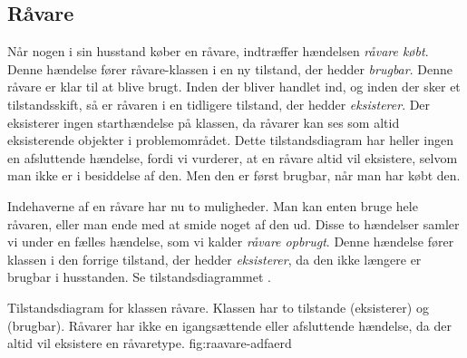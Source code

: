 \subsection{Råvare}
Når nogen i sin husstand køber en råvare, indtræffer hændelsen \textit{råvare købt}. Denne hændelse fører råvare-klassen i en ny tilstand, der hedder \textit{brugbar}. Denne råvare er klar til at blive brugt. Inden der bliver handlet ind, og inden der sker et tilstandsskift, så er råvaren i en tidligere tilstand, der hedder \textit{eksisterer}. Der eksisterer ingen starthændelse på klassen, da råvarer kan ses som altid eksisterende objekter i problemområdet. Dette tilstandsdiagram har heller ingen en afsluttende hændelse, fordi vi vurderer, at en råvare altid vil eksistere, selvom man ikke er i besiddelse af den. Men den er først brugbar, når man har købt den. 

Indehaverne af en råvare har nu to muligheder. Man kan enten bruge hele råvaren, eller man ende med at smide noget af den ud. Disse to hændelser samler vi  under en fælles hændelse, som vi kalder \textit{råvare opbrugt}. Denne hændelse fører klassen i den forrige tilstand, der hedder \textit{eksisterer}, da den ikke længere er brugbar i husstanden. Se tilstandsdiagrammet .

  {Tilstandsdiagram for klassen råvare. Klassen har to tilstande (eksisterer) og (brugbar). Råvarer har ikke en igangsættende eller afsluttende hændelse, da der altid vil eksistere en råvaretype.}
  {fig:raavare-adfaerd}
